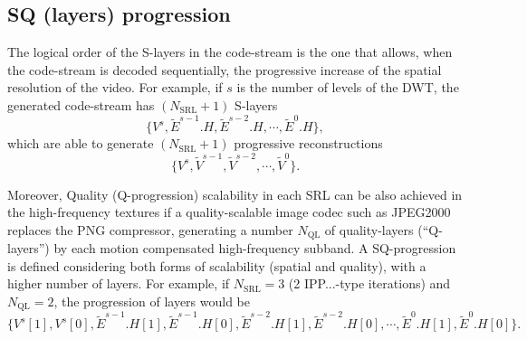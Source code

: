\subsection{SQ (layers) progression}
The logical order of the S-layers in the code-stream is the one that
allows, when the code-stream is decoded sequentially, the progressive
increase of the spatial resolution of the video. For example, if $s$
is the number of levels of the DWT, the generated code-stream has
$(N_{\text{SRL}}+1)$ S-layers
\begin{equation*}
  \{V^s,\tilde{E}^{s-1}.H,\tilde{E}^{s-2}.H,\cdots,\tilde{E}^0.H\},
\end{equation*}
which are able to generate $(N_{\text{SRL}}+1)$ progressive
reconstructions
\begin{equation*}
  \{V^s,\tilde{V}^{s-1},\tilde{V}^{s-2},\cdots,\tilde{V}^0\}.
\end{equation*}

Moreover, Quality (Q-progression) scalability in each SRL can be also
achieved in the high-frequency textures if a quality-scalable image
codec such as JPEG2000~\cite{taubman2002jpeg2000} replaces the PNG
compressor, generating a number $N_{\text{QL}}$ of quality-layers
(``Q-layers'') by each motion compensated high-frequency subband. A
SQ-progression is defined considering both forms of scalability
(spatial and quality), with a higher number of layers. For example, if
$N_{\text{SRL}}=3$ (2 IPP...-type iterations) and $N_{\text{QL}}=2$,
the progression of layers would be
\begin{equation*}
  \{V^s[1],V^s[0],\tilde{E}^{s-1}.H[1],\tilde{E}^{s-1}.H[0],\tilde{E}^{s-2}.H[1],\tilde{E}^{s-2}.H[0],\cdots,\tilde{E}^0.H[1],\tilde{E}^0.H[0]\}.
\end{equation*}


